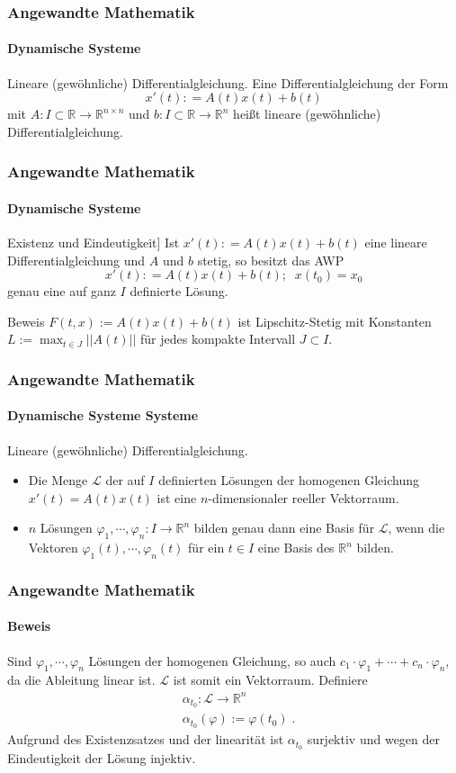 \documentclass{beamer}
\begin{document}
\begin{frame}
    \frametitle{Angewandte Mathematik}
\framesubtitle{Dynamische Systeme }
\begin{block}{Lineare (gewöhnliche) Differentialgleichung.}
Eine Differentialgleichung der Form
$$ x' (t): = A(t) x(t) + b(t)$$
mit $A: I \subset \mathbb{R} \to \mathbb{R}^{n \times n}$ und $b: I \subset \mathbb{R} \to \mathbb{R}^{n}$ heißt lineare (gewöhnliche) Differentialgleichung.
\end{block}

 \end{frame}


\begin{frame}
    \frametitle{Angewandte Mathematik}
\framesubtitle{Dynamische Systeme }
\begin{block}{Existenz und Eindeutigkeit]}
Ist $x' (t): = A(t) x(t) + b(t)$ eine lineare Differentialgleichung und $A$ und $b$ stetig, so besitzt das AWP 
$$ x' (t): = A(t) x(t) + b(t) ; \; \; x(t_0) = x_0 $$
genau eine auf ganz $I$ definierte Lösung.
\end{block}
\begin{block}{Beweis}
$F(t,x):= A(t) x(t) + b(t)$ ist Lipschitz-Stetig mit Konstanten $L:= \max_{t \in J}|| A(t) ||$ für jedes kompakte Intervall $J \subset I$.
\end{block}
 \end{frame}


\begin{frame}
    \frametitle{Angewandte Mathematik}
\framesubtitle{Dynamische Systeme Systeme}
\begin{block}{Lineare (gewöhnliche) Differentialgleichung.}
\begin{itemize}
\item Die Menge $\mathcal{L}$ der auf $I$ definierten Lösungen der homogenen Gleichung $x'(t) = A(t)x(t)$ ist eine $n$-dimensionaler reeller Vektorraum.
\item $n$ Lösungen $\varphi_1, \cdots, \varphi_n : I \to \mathbb{R}^n$ bilden genau dann eine Basis für $\mathcal{L}$, wenn die Vektoren $\varphi_1(t), \cdots, \varphi_n(t)$ für ein $t \in I$ eine Basis des $\mathbb{R}^n$ bilden.
\end{itemize}
\end{block}

 \end{frame}


\begin{frame}
    \frametitle{Angewandte Mathematik}
\framesubtitle{Beweis}
Sind  $\varphi_1, \cdots, \varphi_n$ Lösungen der homogenen Gleichung, so auch $ c_1 \cdot \varphi_1 + \cdots + c_n \cdot \varphi_n$, da die Ableitung linear ist.
$\mathcal{L}$ ist somit ein Vektorraum. Definiere 
\begin{align*}
& \alpha_{t_0} : \mathcal{L} \to \mathbb{R}^n \\
& \alpha_{t_0} (\varphi) := \varphi(t_0) \; .
\end{align*} 
Aufgrund des Existenzsatzes und der linearität ist $ \alpha_{t_0}$ surjektiv und wegen der Eindeutigkeit der Lösung injektiv.
 \end{frame}
\end{document}
